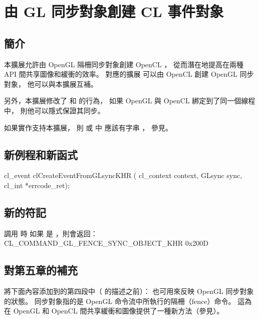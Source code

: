 \section[section:clEvtObjFromGlSync]{由 GL 同步對象創建 CL 事件對象}

\subsection{簡介}

本擴展允許由 OpenGL 隔柵同步對象創建 OpenCL ，
從而潛在地提高在兩種 API 間共享圖像和緩衝的效率。
對應的擴展  可以由 OpenCL 創建 OpenGL 同步對象，
他可以與本擴展互補。

另外，本擴展修改了  和  的行為，
如果 OpenGL  與 OpenCL  綁定到了同一個線程中，
則他可以隱式保證其同步。

如果實作支持本擴展，
則  或  中
應該有字串 ，
參見。

\subsection{新例程和新函式}

\startCLFUNC
cl_event clCreateEventFromGLsyncKHR (
			cl_context context,
			GLsync sync,
			cl_int *errcode_ret);
\stopCLFUNC

\subsection{新的符記}

調用  時
如果  是 ，則會返回：
\startclc
CL_COMMAND_GL_FENCE_SYNC_OBJECT_KHR	0x200D
\stopclc

\subsection{對第五章的補充}

將下面內容添加到\insection[evtObj]的第四段中（ 的描述之前）：
\startreplacepar
{}也可用來反映 OpenGL 同步對象的狀態。
同步對象指的是 OpenGL 命令流中所執行的隔柵（fence）命令。
這為在 OpenGL 和 OpenCL 間共享緩衝和圖像提供了一種新方法（參見\insection[syncCLGL]）。
\stopreplacepar

